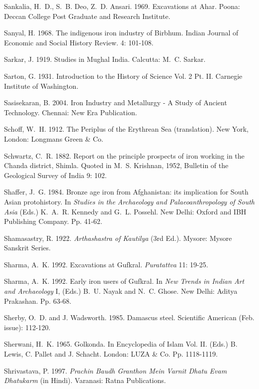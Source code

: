 \begin{thebibliography}{99}
 Sankalia, H.~D., S.~B. Deo, Z.~D. Ansari. 1969. Excavations at Ahar. Poona: Deccan College Post Graduate and Research Institute.

 Sanyal, H. 1968. The indigenous iron industry of Birbhum. Indian Journal of Economic and Social History Review. 4: 101-108. 

 Sarkar, J. 1919. Studies in Mughal India. Calcutta: M.~C. Sarkar. 

 Sarton, G. 1931. Introduction to the History of Science Vol. 2 Pt. II. Carnegie Institute of Washington.

 Sasisekaran, B. 2004. Iron Industry and Metallurgy - A Study of Ancient Technology. Chennai: New Era Publication.

 Schoff, W.~H. 1912. The Periplus of the Erythrean Sea (translation). New York, London: Longmans Green \& Co.

 Schwartz, C.~R. 1882. Report on the principle prospects of iron working in the Chanda district, Shimla. Quoted in M.~S. Krishnan, 1952, Bulletin of the Geological Survey of India 9: 102.

 Shaffer, J.~G. 1984. Bronze age iron from Afghanistan: its implication for South Asian protohistory. In \textit{Studies in the Archaeology and Palaeoanthropology of South Asia} (Eds.) K.~A.~R. Kennedy and G.~L. Possehl. New Delhi: Oxford and IBH Publishing Company. Pp. 41-62. 

 Shamasastry, R. 1922. \textit{Arthashastra of Kautilya} (3rd Ed.). Mysore: Mysore Sanskrit Series.

 Sharma, A.~K. 1992. Excavations at Gufkral. \textit{Puratattva} 11: 19-25.

 Sharma, A.~K. 1992. Early iron users of Gufkral. In \textit{New Trends in Indian Art and Archaeology} I, (Eds.) B.~U. Nayak and N.~C. Ghose. New Delhi: Aditya Prakashan. Pp. 63-68.

 Sherby, O.~D. and J. Wadsworth. 1985. Damascus steel. Scientific American (Feb. issue): 112-120.

 Sherwani, H.~K. 1965. Golkonda. In Encyclopedia of Islam Vol. II. (Eds.) B. Lewis, C. Pallet and J. Schacht. London: LUZA \& Co. Pp. 1118-1119. 

 Shrivastava, P. 1997. \textit{Prachin Baudh Granthon Mein Varnit Dhatu Evam Dhatukarm} (in Hindi). Varanasi: Ratna Publications.


\end{thebibliography}
